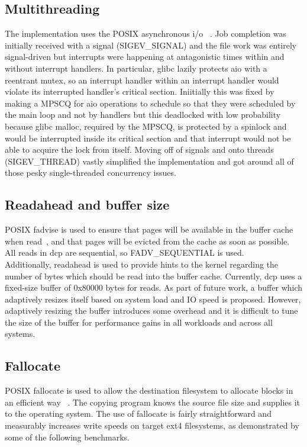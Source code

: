 \documentclass[12pt]{article}
\begin{document}
\subsection{Multithreading}
The implementation uses the POSIX asynchronous i/o ~\cite{aio}. Job completion was initially
received with a signal (SIGEV\_SIGNAL) and the file work was entirely signal-driven
but interrupts were happening at antagonistic times within and without interrupt
handlers. In particular, glibc lazily protects aio with a reentrant mutex, so an
interrupt handler within an interrupt handler would violate its interrupted handler's
critical section. Iniitially this was fixed by making a MPSCQ for aio operations to schedule
so that they were scheduled by the main loop and not by handlers but this deadlocked with low
probability because glibc malloc, required by the MPSCQ, is protected by a spinlock and
would be interrupted inside its critical section and that interrupt would not be
able to acquire the lock from itself. Moving off of signals and onto threads (SIGEV\_THREAD)
vastly simplified the implementation and got around all of those pesky single-threaded
concurrency issues. \\

\subsection{Readahead and buffer size}
POSIX fadvise is used to ensure that pages will be available
in the buffer cache when read~\cite{fadvise}, and that pages will be evicted from
the cache as soon as possible. All reads in dcp are
sequential, so FADV\_SEQUENTIAL is used. \\

Additionally, readahead is used to provide hints to the kernel
regarding the number of bytes which should be read into the buffer cache.
Currently, dcp uses a fixed-size buffer of 0x80000 bytes for reads.
As part of future work, a buffer which adaptively resizes itself based on system
load and IO speed is proposed. However, adaptively resizing the buffer introduces
some overhead and it is difficult to tune the size of the buffer for performance gains
in all workloads and across all systems. \\%

\subsection{Fallocate}
POSIX fallocate is used to allow the destination filesystem to
allocate blocks in an efficient way ~\cite{fallocate}. The copying program knows
the source file size and supplies it to the operating system.
The use of fallocate is fairly straightforward and measurably
increases write speeds on target ext4 filesystems, as demonstrated
by some of the following benchmarks. \\
\end{document}
